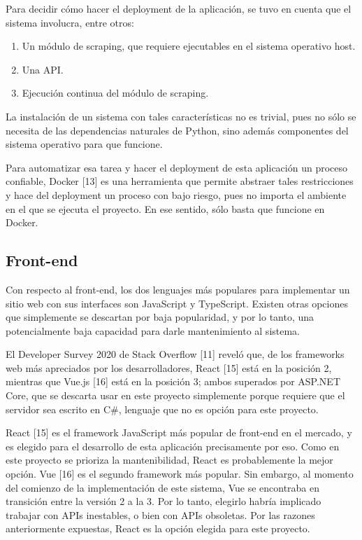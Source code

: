 Para decidir cómo hacer el deployment de la aplicación, se tuvo en cuenta que el
sistema involucra, entre otros:

\begin{enumerate}
    \item Un módulo de scraping, que requiere ejecutables en el sistema
    operativo host.
    \item Una API.
    \item Ejecución continua del módulo de scraping.
\end{enumerate}

La instalación de un sistema con tales características no es trivial, pues no
sólo se necesita de las dependencias naturales de Python, sino además
componentes del sistema operativo para que funcione.

Para automatizar esa tarea y hacer el deployment de esta aplicación un proceso
confiable, Docker [13] es una herramienta que permite abstraer tales
restricciones y hace del deployment un proceso con bajo riesgo, pues no importa
el ambiente en el que se ejecuta el proyecto. En ese sentido, sólo basta que
funcione en Docker.

\subsection{Front-end}

Con respecto al front-end, los dos lenguajes más populares para implementar un
sitio web con sus interfaces son JavaScript y TypeScript. Existen otras opciones
que simplemente se descartan por baja popularidad, y por lo tanto, una
potencialmente baja capacidad para darle mantenimiento al sistema.

El Developer Survey 2020 de Stack Overflow [11] reveló que, de los frameworks
web más apreciados por los desarrolladores, React [15] está en la posición 2,
mientras que Vue.js [16] está en la posición 3; ambos superados por ASP.NET
Core, que se descarta usar en este proyecto simplemente porque requiere que el
servidor sea escrito en C\#, lenguaje que no es opción para este proyecto.

React [15] es el framework JavaScript más popular de front-end en el mercado, y
es elegido para el desarrollo de esta aplicación precisamente por eso. Como en
este proyecto se prioriza la mantenibilidad, React es probablemente la mejor
opción. Vue [16] es el segundo framework más popular. Sin embargo, al momento
del comienzo de la implementación de este sistema, Vue se encontraba en
transición entre la versión 2 a la 3. Por lo tanto, elegirlo habría implicado
trabajar con APIs inestables, o bien con APIs obsoletas. Por las razones
anteriormente expuestas, React es la opción elegida para este proyecto.

